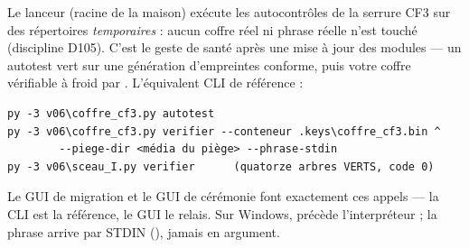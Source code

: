 Le lanceur  (racine de la maison) exécute les
autocontrôles de la serrure CF3 sur des répertoires \emph{temporaires} : aucun coffre
réel ni phrase réelle n'est touché (discipline D105). C'est le geste de santé après
une mise à jour des modules — un autotest vert sur une génération d'empreintes
conforme, puis votre coffre vérifiable à froid par . L'équivalent CLI
de référence :

\begin{lstlisting}
py -3 v06\coffre_cf3.py autotest
py -3 v06\coffre_cf3.py verifier --conteneur .keys\coffre_cf3.bin ^
        --piege-dir <média du piège> --phrase-stdin
py -3 v06\sceau_I.py verifier      (quatorze arbres VERTS, code 0)
\end{lstlisting}

Le GUI de migration et le GUI de cérémonie font exactement ces appels — la CLI est la
référence, le GUI le relais. Sur Windows,  précède l'interpréteur ; la
phrase arrive par STDIN (), jamais en argument.
